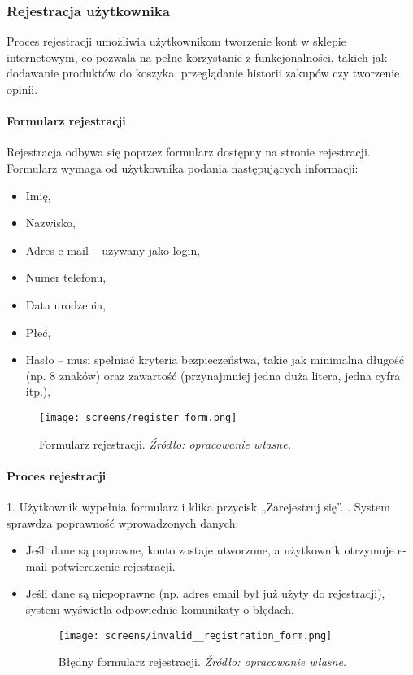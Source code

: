 \documentclass[12pt,a4paper,oneside]{article}
\theoremstyle{definition}
\numberwithin{equation}{section}
\begin{document}
\subsubsection{Rejestracja użytkownika}
Proces rejestracji umożliwia użytkownikom tworzenie kont w sklepie internetowym, co pozwala na pełne korzystanie z funkcjonalności, takich jak dodawanie produktów do koszyka, przeglądanie historii zakupów czy tworzenie opinii.

\paragraph{Formularz rejestracji}
Rejestracja odbywa się poprzez formularz dostępny na stronie rejestracji. Formularz wymaga od użytkownika podania następujących informacji:
\begin{itemize}
    \item Imię,
    \item Nazwisko,
    \item Adres e-mail – używany jako login,
    \item Numer telefonu,
    \item Data urodzenia,
    \item Płeć,
    \item Hasło – musi spełniać kryteria bezpieczeństwa, takie jak minimalna długość (np. 8 znaków) oraz zawartość (przynajmniej jedna duża litera, jedna cyfra itp.),
\end{itemize}

\begin{figure}[H]
    \centering
    \texttt{[image: screens/register\_form.png]}
    \caption{Formularz rejestracji. \emph{Źródło: opracowanie własne.}}
    \label{fig:registration_form}
\end{figure}

\paragraph{Proces rejestracji}
1. Użytkownik wypełnia formularz i klika przycisk „Zarejestruj się”. . System sprawdza poprawność wprowadzonych danych:
   \begin{itemize}
       \item Jeśli dane są poprawne, konto zostaje utworzone, a użytkownik otrzymuje e-mail potwierdzenie rejestracji.
       \item Jeśli dane są niepoprawne (np. adres email był już użyty do rejestracji), system wyświetla odpowiednie komunikaty o błędach.
       \begin{figure}[H]
        \centering
        \texttt{[image: screens/invalid\_\_registration\_form.png]}
        \caption{Błędny formularz rejestracji. \emph{Źródło: opracowanie własne.}}
        \label{fig:invalid_registration_form}
    \end{figure}
   \end{itemize}
\end{document}
